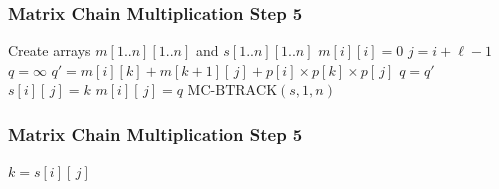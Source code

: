 \documentclass{beamer}
\begin{document}
\begin{frame} \frametitle{Matrix Chain Multiplication Step 5}
  {\scriptsize
  \begin{algorithmic}[1]
    \State Create arrays $m[1..n][1..n]$ and $s[1..n][1..n]$
      \State $m[i][i] = 0$ 
    \EndFor
     
        \State $j = i + \ell - 1$
        \State $q=\infty$
          \State $q' = m[i][k] + m[k+1][\,j] + p[i] \times p[k] \times p[\,j]$
            \State $q = q'$
            \State $s[i][\, j] = k$
          \EndIf
        \EndFor
        \State $m[i][\,j] = q$
      \EndFor
    \EndFor
    \State \Return $\text{MC-BTRACK}(s, 1, n)$
    \EndFunction
  \end{algorithmic}
  }
\end{frame}

\begin{frame} \frametitle{Matrix Chain Multiplication Step 5}
  {\scriptsize
  \begin{algorithmic}[1]
     
      \State {}
    \EndIf
    \State $k = s[i][\, j]$
    \State {}
    \EndFunction
  \end{algorithmic}
  }
\end{frame}
\end{document}
